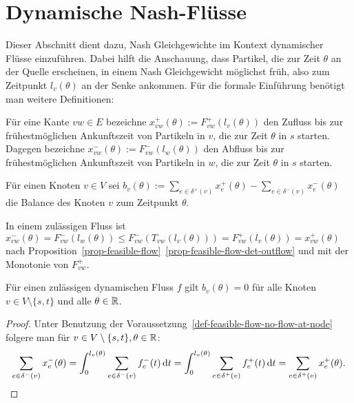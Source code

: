\section{Dynamische Nash-Flüsse}\label{sec-nash-flows}

Dieser Abschnitt dient dazu, Nash Gleichgewichte im Kontext dynamischer Flüsse einzuführen.
Dabei hilft die Anschauung, dass Partikel, die zur Zeit $\theta$ an der Quelle erscheinen, in einem Nash Gleichgewicht möglichst früh, also zum Zeitpunkt $l_v(\theta)$ an der Senke ankommen.
Für die formale Einführung benötigt man weitere Definitionen: 

\begin{definition}
	Für eine Kante $vw\in E$ bezeichne $x_{vw}^+(\theta):= F_{vw}^+(l_v(\theta))$ den Zufluss bis zur frühestmöglichen Ankunftszeit von Partikeln in $v$, die zur Zeit $\theta$ in $s$ starten.\\
	Dagegen bezeichne $x_{vw}^-(\theta):= F^-_{vw}(l_w(\theta))$ den Abfluss bis zur frühestmöglichen Ankunftszeit von Partikeln in $w$, die zur Zeit $\theta$ in $s$ starten.
	
	Für einen Knoten $v\in V$ sei $b_v(\theta):=\sum_{e\in\delta^+(v)} x_e^+(\theta) - \sum_{e\in\delta^-(v)} x_e^-(\theta)$ die Balance des Knoten $v$ zum Zeitpunkt $\theta$.
\end{definition}

\begin{remark}\label{remark-x^-leqx^+}
	In einem zulässigen Fluss ist $x_{vw}^-(\theta) = F_{vw}^-(l_w(\theta)) \leq F_{vw}^-(T_{vw}(l_v(\theta)))=F_{vw}^+(l_v(\theta)) = x_{vw}^+(\theta)$
	nach Proposition~\ref{prop-feasible-flow}~\ref{prop-feasible-flow-det-outflow} und mit der Monotonie von $F_{vw}^+$.
\end{remark}

\begin{lemma}\label{lemma-balance-0}
	Für einen zulässigen dynamischen Fluss $f$ gilt $b_v(\theta)=0$ für alle Knoten $v\in V\setminus\{ s,t \}$ und alle $\theta\in\mathbb{R}$.
\end{lemma}
\begin{proof}
	Unter Benutzung der Voraussetzung~\ref{def-feasible-flow-no-flow-at-node} folgere man für $v\in V\setminus \{ s, t\}, \theta\in\mathbb{R}$:
	$$\sum_{e\in\delta^-(v)} x_e^-(\theta) = \int_{0}^{l_v(\theta)} \sum_{e\in\delta^-(v)} f_e^-(t) \mathop{}\!\mathrm{d} t = \int_{0}^{l_v(\theta)} \sum_{e\in\delta^+(v)} f_e^+(t) \mathop{}\!\mathrm{d} t = \sum_{e\in\delta^+(v)}x_e^+(\theta).$$
\vspace{-1.4 \baselineskip}

\end{proof}


